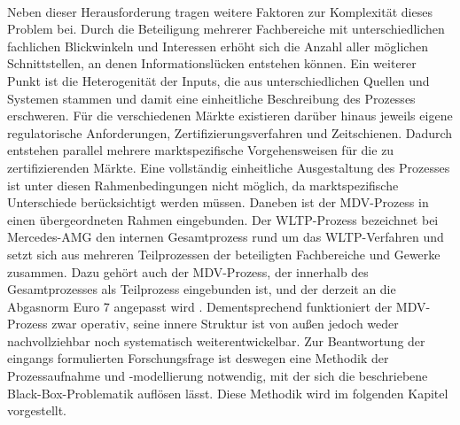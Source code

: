 \\
Neben dieser Herausforderung tragen weitere Faktoren zur Komplexität dieses Problem bei. Durch die Beteiligung mehrerer Fachbereiche mit unterschiedlichen fachlichen Blickwinkeln und Interessen erhöht sich die Anzahl aller möglichen Schnittstellen, an denen Informationslücken entstehen können. Ein weiterer Punkt ist die Heterogenität der Inputs, die aus unterschiedlichen Quellen und Systemen stammen und damit eine einheitliche Beschreibung des Prozesses erschweren. Für die verschiedenen Märkte existieren darüber hinaus jeweils eigene regulatorische Anforderungen, Zertifizierungsverfahren und Zeitschienen. Dadurch entstehen parallel mehrere marktspezifische Vorgehensweisen für die zu zertifizierenden Märkte. Eine vollständig einheitliche Ausgestaltung des Prozesses ist unter diesen Rahmenbedingungen nicht möglich, da marktspezifische Unterschiede berücksichtigt werden müssen. Daneben ist der MDV-Prozess in einen übergeordneten Rahmen eingebunden. Der \acs{WLTP}-Prozess bezeichnet bei Mercedes-AMG den internen Gesamtprozess rund um das \acs{WLTP}-Verfahren und setzt sich aus mehreren Teilprozessen der beteiligten Fachbereiche und Gewerke zusammen. Dazu gehört auch der MDV-Prozess, der innerhalb des Gesamtprozesses als Teilprozess eingebunden ist, und der derzeit an die Abgasnorm Euro 7 angepasst wird . Dementsprechend funktioniert der MDV-Prozess zwar operativ, seine innere Struktur ist von außen jedoch weder nachvollziehbar noch systematisch weiterentwickelbar. Zur Beantwortung der eingangs formulierten Forschungsfrage ist deswegen eine Methodik der Prozessaufnahme und -modellierung notwendig, mit der sich die beschriebene Black-Box-Problematik auflösen lässt. Diese Methodik wird im folgenden Kapitel vorgestellt.









